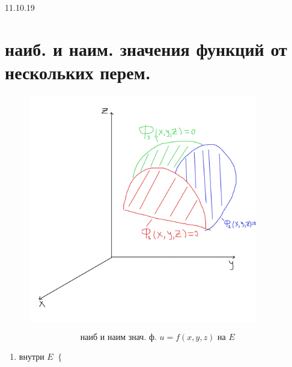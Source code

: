 \documentclass[12pt, fleqn]{article}
\begin{document}
\begin{lect} {11.10.19}
        \section{наиб. и наим. значения функций от нескольких перем.}
        \begin{Definition}
            \begin{figure}[H]
                \includegraphics[width=10cm]{pics/1.png}
                \centering
            \end{figure}
            \[\text{ наиб и наим знач. ф. } u = f(x, y, z) \text{ на } E\]
            \begin{enumerate}
                \item внутри $E$ \Ra $\begin{cases}
                    
                \end{cases}$
            \end{enumerate}
        \end{Definition} 
    \end{lect} 
\end{document}
